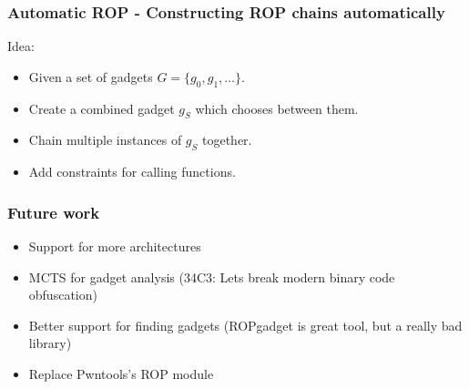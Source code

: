 \documentclass{beamer}
\begin{document}
\begin{frame}
    \frametitle{Automatic ROP - Constructing ROP chains automatically}
    Idea:
    \begin{itemize}
        \pause \item Given a set of gadgets $G = \{g_0, g_1, \ldots\}$.
        \pause \item Create a combined gadget $g_S$ which chooses between them.
        \pause \item Chain multiple instances of $g_S$ together.
        \pause \item Add constraints for calling functions.
    \end{itemize}
\end{frame}



\begin{frame}
    \frametitle{Future work}
    \begin{itemize}
        \item Support for more architectures
        \item MCTS for gadget analysis (34C3: Lets break modern binary code obfuscation)
        \item Better support for finding gadgets (ROPgadget is great tool, but a really bad library)
        \item Replace Pwntools's ROP module
    \end{itemize}
\end{frame}
\end{document}
